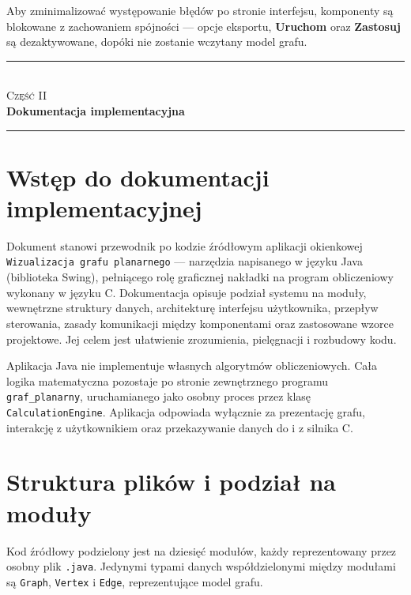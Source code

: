 \documentclass[a4paper, 11pt]{article}
\newcommand{\partpage}[2]{%
  \clearpage
  \thispagestyle{empty}
  \vspace*{6cm}
  \begin{center}
    {\color{rulegray}\rule{0.4\textwidth}{0.6pt}}\\[1em]
    {\fontsize{11}{13}\selectfont\scshape\color{rulegray}#1}\\[0.6em]
    {\fontsize{28}{34}\selectfont\bfseries\color{primary}#2}\\[1em]
    {\color{rulegray}\rule{0.4\textwidth}{0.6pt}}
  \end{center}
  \clearpage
}
\begin{document}
Aby zminimalizować występowanie błędów po stronie interfejsu, komponenty są blokowane z zachowaniem spójności --- opcje eksportu, \textbf{Uruchom} oraz \textbf{Zastosuj} są dezaktywowane, dopóki nie zostanie wczytany model grafu.



\partpage{Część II}{Dokumentacja implementacyjna}

\section{Wstęp do dokumentacji implementacyjnej}

Dokument stanowi przewodnik po kodzie źródłowym aplikacji okienkowej
\texttt{Wizualizacja grafu planarnego} --- narzędzia napisanego w języku
Java (biblioteka Swing), pełniącego rolę graficznej nakładki na program
obliczeniowy wykonany w języku C. Dokumentacja opisuje podział systemu
na moduły, wewnętrzne struktury danych, architekturę interfejsu
użytkownika, przepływ sterowania, zasady komunikacji między komponentami
oraz zastosowane wzorce projektowe. Jej celem jest ułatwienie zrozumienia,
pielęgnacji i rozbudowy kodu.

Aplikacja Java nie implementuje własnych algorytmów obliczeniowych.
Cała logika matematyczna pozostaje po stronie zewnętrznego
programu \texttt{graf\_planarny}, uruchamianego jako osobny proces
przez klasę \texttt{CalculationEngine}. Aplikacja odpowiada wyłącznie
za prezentację grafu, interakcję z użytkownikiem oraz przekazywanie
danych do i z silnika C.

\section{Struktura plików i podział na moduły}

Kod źródłowy podzielony jest na dziesięć modułów, każdy reprezentowany
przez osobny plik \texttt{.java}. Jedynymi typami danych współdzielonymi
między modułami są \texttt{Graph}, \texttt{Vertex} i \texttt{Edge},
reprezentujące model grafu.
\end{document}
